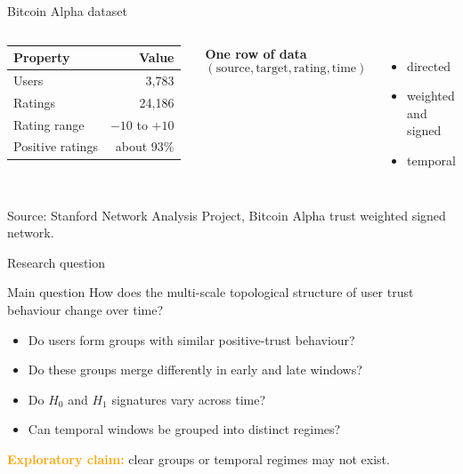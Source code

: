 \documentclass[aspectratio=169,11pt]{beamer}
\newcommand{\term}[1]{\textcolor{Ocean}{\textbf{#1}}}
\newcommand{\caution}[1]{\textcolor{Orange}{\textbf{#1}}}
\newcommand{\source}[1]{\vfill{\scriptsize\color{Muted}Source: #1}}
\begin{document}
\begin{frame}{Bitcoin Alpha dataset}
  \begin{columns}[T,onlytextwidth]
      \renewcommand{\arraystretch}{1.18}
      \begin{tabularx}{\linewidth}{@{}Xr@{}}
        \toprule
        \textbf{Property} & \textbf{Value} \\
        \midrule
        Users & 3,783 \\
        Ratings & 24,186 \\
        Rating range & $-10$ to $+10$ \\
        Positive ratings & about 93\% \\
        \bottomrule
      \end{tabularx}

      \term{One row of data}
      \[
        (\text{source},\text{target},\text{rating},\text{time})
      \]
      \vspace{0.25cm}
      \begin{itemize}
        \item directed
        \item weighted and signed
        \item temporal
      \end{itemize}
  \end{columns}

  \source{Stanford Network Analysis Project, Bitcoin Alpha trust weighted signed network.}
\end{frame}

\begin{frame}{Research question}
  \vspace{0.25cm}
  \begin{block}{Main question}
    How does the multi-scale topological structure of user trust behaviour change over time?
  \end{block}

  \vspace{0.25cm}
  \begin{itemize}
    \item Do users form groups with similar positive-trust behaviour?
    \item Do these groups merge differently in early and late windows?
    \item Do $H_0$ and $H_1$ signatures vary across time?
    \item Can temporal windows be grouped into distinct regimes?
  \end{itemize}

  \vspace{0.25cm}
  \caution{Exploratory claim:} clear groups or temporal regimes may not exist.
\end{frame}
\end{document}
